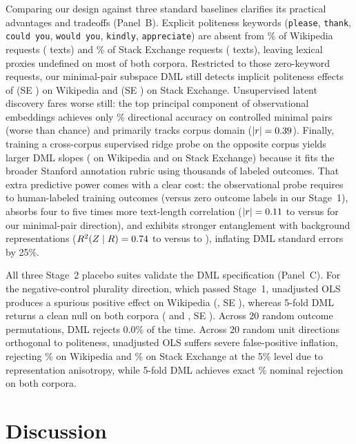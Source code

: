 \documentclass[11pt]{article}
\begin{document}
Comparing our design against three standard baselines clarifies its practical advantages and tradeoffs (Panel~B). Explicit politeness keywords (\texttt{please}, \texttt{thank}, \texttt{could you}, \texttt{would you}, \texttt{kindly}, \texttt{appreciate}) are absent from \empWikiNoKwPct\% of Wikipedia requests (\empWikiNoKwN{} texts) and \empSeNoKwPct\% of Stack Exchange requests (\empSeNoKwN{} texts), leaving lexical proxies undefined on most of both corpora. Restricted to those zero-keyword requests, our minimal-pair subspace DML still detects implicit politeness effects of \empWikiImp{} (SE \empWikiImpSe) on Wikipedia and \empSeImp{} (SE \empSeImpSe) on Stack Exchange. Unsupervised latent discovery fares worse still: the top principal component of observational embeddings achieves only \empPcPairAcc\% directional accuracy on controlled minimal pairs (worse than chance) and primarily tracks corpus domain ($|r| = 0.39$). Finally, training a cross-corpus supervised ridge probe on the opposite corpus yields larger DML slopes (\empWikiProbe{} on Wikipedia and \empSeProbe{} on Stack Exchange) because it fits the broader Stanford annotation rubric using thousands of labeled outcomes. That extra predictive power comes with a clear cost: the observational probe requires \empNWiki{} to \empNSe{} human-labeled training outcomes (versus zero outcome labels in our Stage~1), absorbs four to five times more text-length correlation ($|r| = 0.11$ to \empRLenProbeHi{} versus \empRLenOurs{} for our minimal-pair direction), and exhibits stronger entanglement with background representations ($R^2(Z \mid R) = 0.74$ to \empWikiProbeRTwo{} versus \empSeRTwo{} to \empWikiRTwo), inflating DML standard errors by 25\%.

All three Stage~2 placebo suites validate the DML specification (Panel~C). For the negative-control plurality direction, which passed Stage~1, unadjusted OLS produces a spurious positive effect on Wikipedia (\empWikiPluOls, SE \empWikiPluOlsSe), whereas 5-fold DML returns a clean null on both corpora (\empWikiPluDml{} and \empSePluDml, SE \empWikiPluDmlSe). Across 20 random outcome permutations, DML rejects 0.0\% of the time. Across 20 random unit directions orthogonal to politeness, unadjusted OLS suffers severe false-positive inflation, rejecting \empWikiRandOls\% on Wikipedia and \empSeRandOls\% on Stack Exchange at the 5\% level due to representation anisotropy, while 5-fold DML achieves exact \empWikiRandDml\% nominal rejection on both corpora.

\section{Discussion}
\end{document}

